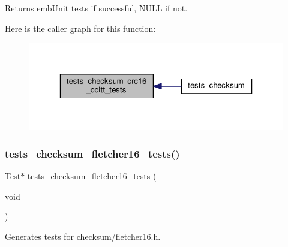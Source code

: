 \begin{DoxyReturn}{Returns}
emb\+Unit tests if successful, N\+U\+LL if not. 
\end{DoxyReturn}
Here is the caller graph for this function\+:
\nopagebreak
\begin{figure}[H]
\begin{center}
\leavevmode
\includegraphics[width=323pt]{group__unittests_gab14760f94862d361e37621a414849ac6_icgraph}
\end{center}
\end{figure}
\mbox{\label{group__unittests_gae4f6cce052a84dde051799a5a57d9e44}} 
\subsubsection{\texorpdfstring{tests\+\_\+checksum\+\_\+fletcher16\+\_\+tests()}{tests\_checksum\_fletcher16\_tests()}}
{\footnotesize\ttfamily Test$\ast$ tests\+\_\+checksum\+\_\+fletcher16\+\_\+tests (\begin{DoxyParamCaption}\item[{void}]{ }\end{DoxyParamCaption})}



Generates tests for checksum/fletcher16.\+h. 

